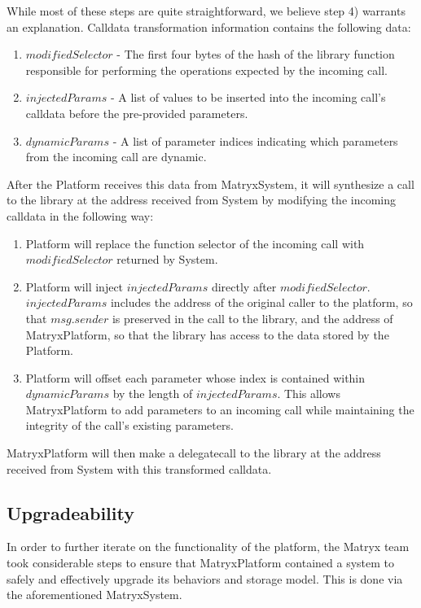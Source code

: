\documentclass[a4paper, 10pt, conference]{ieeeconf}      %
\begin{document}
While most of these steps are quite straightforward, we believe step 4) warrants an explanation. Calldata transformation information contains the following data:

\begin{enumerate}
\item $modifiedSelector$ - The first four bytes of the hash of the library function responsible for performing the operations expected by the incoming call.
\item $injectedParams$ - A list of values to be inserted into the incoming call's calldata before the pre-provided parameters.
\item $dynamicParams$ - A list of parameter indices indicating which parameters from the incoming call are dynamic.
\end{enumerate}

After the Platform receives this data from MatryxSystem, it will synthesize a call to the library at the address received from System by modifying the incoming calldata in the following way:
\begin{enumerate}
\item Platform will replace the function selector of the incoming call with $modifiedSelector$ returned by System.
\item Platform will inject $injectedParams$ directly after $modifiedSelector$. $injectedParams$ includes the address of the original caller to the platform, so that $msg.sender$ is preserved in the call to the library, and the address of MatryxPlatform, so that the library has access to the data stored by the Platform.
\item Platform will offset each parameter whose index is contained within $dynamicParams$ by the length of $injectedParams$. This allows MatryxPlatform to add parameters to an incoming call while maintaining the integrity of the call's existing parameters.
\end{enumerate}

MatryxPlatform will then make a delegatecall to the library at the address received from System with this transformed calldata.

\subsection{Upgradeability}\label{upgradeability}
In order to further iterate on the functionality of the platform, the Matryx team took considerable steps to ensure that MatryxPlatform contained a system to safely and effectively upgrade its behaviors and storage model.
This is done via the aforementioned MatryxSystem.
\end{document}
